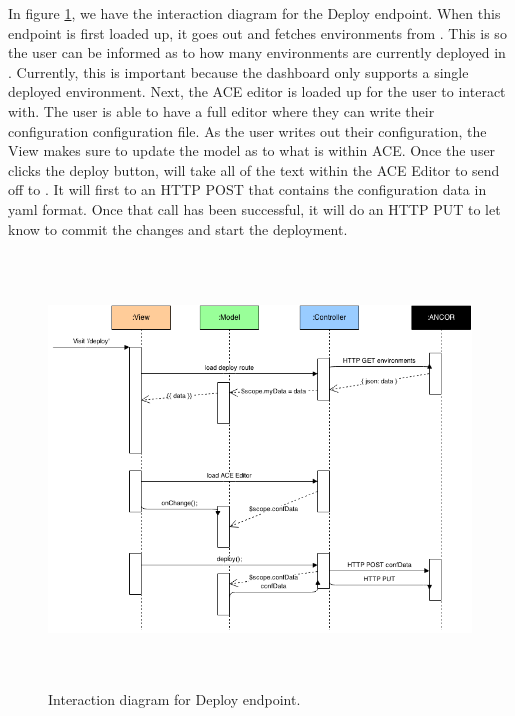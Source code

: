 In figure \ref{deployInterDiagram}, we have the interaction diagram for the Deploy endpoint. When this endpoint is first loaded up, it goes out and fetches environments from \ancor{}. This is so the user can be informed as to how many environments are currently deployed in \ancor{}. Currently, this is important because the dashboard only supports a single deployed environment. Next, the ACE editor is loaded up for the user to interact with. The user is able to have a full editor where they can write their configuration configuration file. As the user writes out their configuration, the View makes sure to update the model as to what is within ACE. Once the user clicks the deploy button, \projectName{} will take all of the text within the ACE Editor to send off to \ancor{}. It will first to an HTTP POST that contains the configuration data in yaml format. Once that call has been successful, it will do an HTTP PUT to let \ancor{} know to commit the changes and start the deployment.

\begin{figure}[htb]%

    \includegraphics[height=4.5in]{figures/deploy-instance.png}

    \caption[Deploy Interaction Diagram
    ]{Interaction diagram for Deploy endpoint.}

    \label{deployInterDiagram}
\end{figure}
